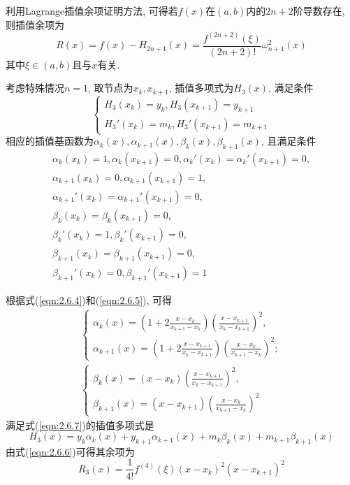 利用Lagrange插值余项证明方法, 可得若$f(x)$在$(a,b)$内的$2n+2$阶导数存在, 则插值余项为
\begin{equation}\label{eqn:2.6.6}
    R(x)=f(x)-H_{2n+1}(x)=\frac{f^{(2n+2)}(\xi)}{(2n+2)!}\omega_{n+1}^2(x)
\end{equation}
其中$\xi\in(a,b)$且与$x$有关.

考虑特殊情况$n=1$, 取节点为$x_k,x_{k+1}$, 插值多项式为$H_3(x)$, 满足条件
\begin{equation}\label{eqn:2.6.7}
    \begin{cases}
        H_3(x_k)=y_k, H_3(x_{k+1})=y_{k+1}\\
        H_3'(x_k)=m_k, H_3'(x_{k+1})=m_{k+1}
    \end{cases}
\end{equation}
相应的插值基函数为$\alpha_k(x),\alpha_{k+1}(x),\beta_k(x),\beta_{k+1}(x)$, 且满足条件
\begin{gather*}
    \alpha_k(x_k)=1,\alpha_k(x_{k+1})=0, \alpha_k'(x_k)=\alpha_k'(x_{k+1})=0,\\
    \alpha_{k+1}(x_k)=0,\alpha_{k+1}(x_{k+1})=1,\\
    \alpha_{k+1}'(x_k)=\alpha_{k+1}'(x_{k+1})=0,\\
    \beta_k(x_k)=\beta_k(x_{k+1})=0,\\
    \beta_k'(x_k)=1,\beta_k'(x_{k+1})=0,\\
    \beta_{k+1}(x_k)=\beta_{k+1}(x_{k+1})=0,\\
    \beta_{k+1}'(x_k)=0,\beta_{k+1}'(x_{k+1})=1
\end{gather*}

根据式(\ref{eqn:2.6.4})和(\ref{eqn:2.6.5}), 可得
\begin{gather*}
    \begin{cases}
        \alpha_k(x)=\left(1+2\frac{x-x_k}{x_{k+1}-x_k}\right)\left(\frac{x-x_{k+1}}{x_k-x_{k+1}}\right)^2,\\
        \alpha_{k+1}(x)=\left(1+2\frac{x-x_{k+1}}{x_k-x_{k+1}}\right)\left(\frac{x-x_{k}}{x_{k+1}-x_{k}}\right)^2;
    \end{cases}\\
    \begin{cases}
        \beta_k(x)=(x-x_k)\left(\frac{x-x_{k+1}}{x_k-x_{k+1}}\right)^2,\\
        \beta_{k+1}(x)=(x-x_{k+1})\left(\frac{x-x_k}{x_{k+1}-x_k}\right)^2
    \end{cases}
\end{gather*}
满足式(\ref{eqn:2.6.7})的插值多项式是
\begin{equation*}
    H_3(x)=y_k\alpha_k(x)+y_{k+1}\alpha_{k+1}(x)+m_k\beta_k(x)+m_{k+1}\beta_{k+1}(x)
\end{equation*}
由式(\ref{eqn:2.6.6})可得其余项为
\begin{equation*}
    R_3(x)=\frac{1}{4!}f^{(4)}(\xi)(x-x_k)^2(x-x_{k+1})^2
\end{equation*}


